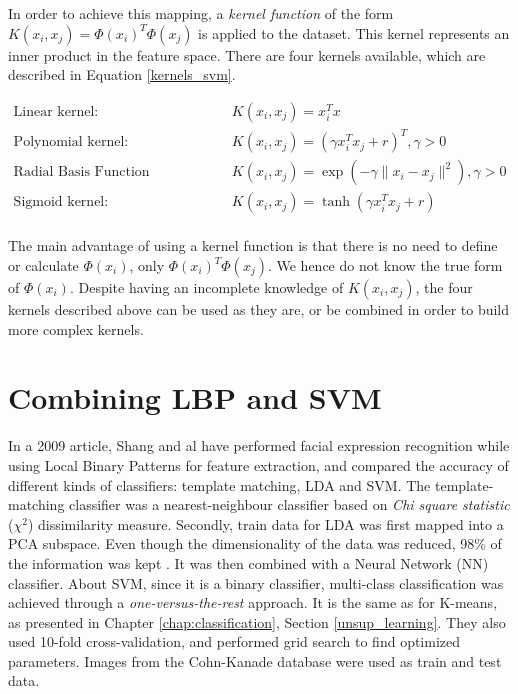 \noindent In order to achieve this mapping, a \textit{kernel function} of the form $K(x_i, x_j) = \Phi(x_i)^T \Phi(x_j)$ is applied to the dataset. This kernel represents an inner product in the feature space. There are four kernels available, which are described in Equation \ref{kernels_svm}.
\newline

\begin{equation}
\begin{array}{ll}
	\text{Linear kernel:} & K(x_i,x_j) = x_i^Tx \\
	\text{Polynomial kernel:} & K(x_i,x_j) = (\gamma x_i^Tx_j + r)^T, \gamma > 0 \\
	\text{Radial Basis Function (Gaussian) kernel:} & K(x_i,x_j) = \exp(-\gamma \| x_i - x_j \|^2), \gamma > 0 \\
	\text{Sigmoid kernel:} & K(x_i,x_j) = \tanh(\gamma x_i^T x_j + r)\\
\end{array}
\label{kernels_svm}
\end{equation}

\vspace{\baselineskip}

\noindent The main advantage of using a kernel function is that there is no need to define or calculate $\Phi(x_i)$, only $\Phi(x_i)^T \Phi(x_j)$. We hence do not know the true form of $\Phi(x_i)$. Despite having an incomplete knowledge of $K(x_i,x_j)$, the four kernels described above can be used as they are, or be combined in order to build more complex kernels.
\newline

\section{Combining LBP and SVM}

\vspace{\baselineskip}
\noindent In a 2009 article, Shang and al \cite{SHA09} have performed facial expression recognition while using Local Binary Patterns for feature extraction, and compared the accuracy of different kinds of classifiers:  template matching,  LDA and SVM. The template-matching classifier was a nearest-neighbour classifier based on \textit{Chi square statistic} ($\chi^2$) dissimilarity measure. Secondly, train data for LDA was first mapped into a PCA subspace. Even though the dimensionality of the data was reduced, 98\% of the information was kept \cite{SHA09}. It was then combined with a Neural Network (NN) classifier. About SVM, since it is a binary classifier, multi-class classification was achieved through a \textit{one-versus-the-rest} approach. It is the same as for K-means, as presented in Chapter \ref{chap:classification}, Section \ref{unsup_learning}. They also used 10-fold cross-validation, and performed grid search to find optimized parameters. Images from the Cohn-Kanade database were used as train and test data.
\newline

